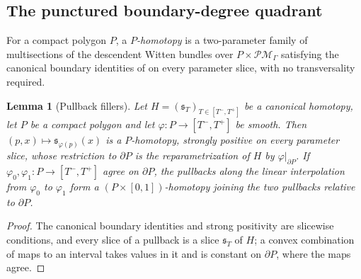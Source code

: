 \documentclass[11pt]{amsart}
\newtheorem{lemma}[theorem]{Lemma}
\theoremstyle{definition}
\theoremstyle{remark}
\begin{document}
\subsection{The punctured boundary-degree quadrant}
\label{ssec:missing}

For a compact polygon $P$, a \emph{$P$-homotopy} is a two-parameter family of
multisections of the descendent Witten bundles over
$P\times\mathcal{PM}_\Gamma$ satisfying the canonical boundary identities of
\cite[Def.~3.22]{GKT} on every parameter slice, with no transversality
required.

\begin{lemma}[Pullback fillers]
\label{lem:polytopeextension}
Let $H=(\mathfrak s_T)_{T\in[T^-,T^+]}$ be a canonical homotopy, let $P$ be a
compact polygon and let $\varphi:P\to[T^-,T^+]$ be smooth.  Then
$(p,x)\mapsto\mathfrak s_{\varphi(p)}(x)$ is a $P$-homotopy, strongly positive
on every parameter slice, whose restriction to $\partial P$ is the
reparametrization of $H$ by $\varphi|_{\partial P}$.  If
$\varphi_0,\varphi_1:P\to[T^-,T^+]$ agree on $\partial P$, the pullbacks along
the linear interpolation from $\varphi_0$ to $\varphi_1$ form a
$(P\times[0,1])$-homotopy joining the two pullbacks relative to $\partial P$.
\end{lemma}

\begin{proof}
The canonical boundary identities and strong positivity are slicewise
conditions, and every slice of a pullback is a slice $\mathfrak s_T$ of $H$; a convex combination of maps to an interval takes
values in it and is constant on $\partial P$, where the maps agree.
\end{proof}
\end{document}
